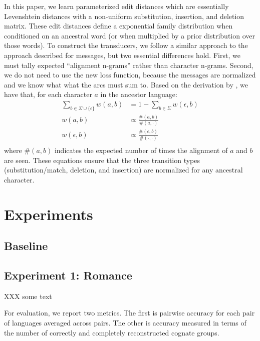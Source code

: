 \documentclass[11pt,a4paper]{article}
\begin{document}
In this paper, we learn parameterized edit distances which are
essentially Levenshtein distances with a non-uniform substitution,
insertion, and deletion matrix. These edit distances define a
exponential family distribution when conditioned on an ancestral
word (or when multiplied by a prior distribution over those words).
To construct the transducers, we follow a similar approach to the
approach described for messages, but two essential differences hold.
First, we must tally expected ``alignment n-grams'' rather than
character n-grams. Second, we do not need to use the new loss
function, because the messages are normalized and we know what what
the arcs must sum to. Based on the derivation by 
, we have that, for each character $a$ in the ancestor language:
\begin{equation}
  \begin{split}
    \sum_{b \in \Sigma \cup \{\epsilon\}} w(a,b) &= 1 - \sum_{b \in \Sigma} w(\epsilon,b) \\
    w(a,b) &\propto \frac{\#(a,b)}{\#(a,\cdot)} \\
    w(\epsilon,b) &\propto \frac{\#(\epsilon,b)}{\#(\cdot,\cdot)} \\
   \end{split}
 \end{equation}
where $\#(a,b)$ indicates the expected number of times the alignment
of $a$ and $b$ are seen. These equations ensure that the three transition
types (substitution/match, deletion, and insertion) are normalized for
any ancestral character.

\section{Experiments}

\subsection{Baseline}

\subsection{Experiment 1: Romance}

XXX some text


For evaluation, we report two metrics. The first is pairwise accuracy
for each pair of languages averaged across pairs. The other
is accuracy measured in terms of the number of correctly and
completely reconstructed cognate groups. 
\end{document}
